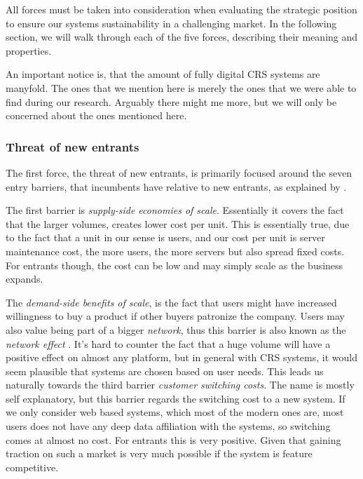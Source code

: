 All forces must be taken into consideration when evaluating the strategic position to ensure our systems sustainability  in a challenging market. 
In the following section, we will walk through each of the five forces, describing their meaning and properties.

An important notice is, that the amount of fully digital CRS systems are manyfold. The ones that we mention here is merely the ones that we were able to find during our research. Arguably there might me more, but we will only be concerned about the ones mentioned here. 


\subsubsection{Threat of new entrants}
The first force, the threat of new entrants, is primarily focused around the seven entry barriers, that incumbents have relative to new entrants, as explained by .

The first barrier is \emph{supply-side economies of scale}. Essentially it covers the fact that the larger volumes, creates lower cost per unit. This is essentially true, due to the fact that a unit in our sense is users, and our cost per unit is server maintenance cost, the more users, the more servers but also spread fixed costs. For entrants though, the cost can be low and may simply scale as the business expands.

The \emph{demand-side benefits of scale}, is the fact that users might have increased willingness to buy a product if other buyers patronize the company. Users may also value being part of a bigger \emph{network}, thus this barrier is also known as the \emph{network effect} \cite[p.~81]{porter2008five}. It's hard to counter the fact that a huge volume will have a positive effect on almost any platform, but in general with CRS systems, it would seem plausible that systems are chosen based on user needs. This leads us naturally towards the third barrier \emph{customer switching costs}. The name is mostly self explanatory, but this barrier regards the switching cost to a new system. If we only consider web based systems, which most of the modern ones are, most users does not have any deep data affiliation with the systems, so switching comes at almost no cost. For entrants this is very positive. Given that gaining traction on such a market is very much possible if the system is feature competitive.

